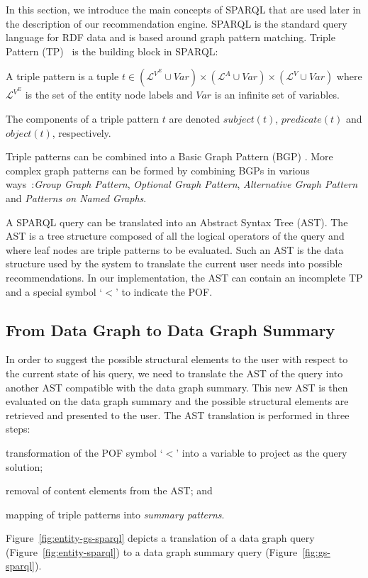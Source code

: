 In this section, we introduce the main concepts of SPARQL that are used later in the description of our recommendation engine. SPARQL is the standard query language for RDF data and is based around graph pattern matching. Triple Pattern (TP)~\cite{PrudS08} is the building block in SPARQL:

\begin{definition} A triple pattern is a tuple $t \in (\mathcal{L}^{V^E} \cup Var) \times (\mathcal{L}^A \cup Var) \times (\mathcal{L}^V \cup Var)$ where $\mathcal{L}^{V^E}$ is the set of the entity node labels and $Var$ is an infinite set of variables.
\label{def:triple-pattern}
\end{definition}
The components of a triple pattern $t$ are denoted $subject(t)$, $predicate(t)$ and $object(t)$, respectively.

Triple patterns can be combined into a Basic Graph Pattern (BGP) \cite{PrudS08}. More complex graph patterns can be formed by combining BGPs in various ways~\cite{PrudS08}:\emph{Group Graph Pattern}, \emph{Optional Graph Pattern}, \emph{Alternative Graph Pattern} and \emph{Patterns on Named Graphs}.

A SPARQL query can be translated into an Abstract Syntax Tree (AST). The AST is a tree structure composed of all the logical operators of the query and where leaf nodes are triple patterns to be evaluated. Such an AST is the data structure used by the system to translate the current user needs into possible recommendations. In our implementation, the AST can contain an incomplete TP and a special symbol `$<$' to indicate the POF.

\subsection{From Data Graph to Data Graph Summary}

In order to suggest the possible structural elements to the user with respect to the current state of his query, we need to translate the AST of the query into another AST compatible with the data graph summary. This new AST is then evaluated on the data graph summary and the possible structural elements are retrieved and presented to the user. The AST translation is performed in three steps:
\begin{inparaenum}
\item transformation of the POF symbol `$<$' into a variable to project as the query solution;
\item removal of content elements from the AST; and
\item mapping of triple patterns into \emph{summary patterns}.
\end{inparaenum}
Figure~\ref{fig:entity-gs-sparql} depicts a translation of a data graph query (Figure~\ref{fig:entity-sparql}) to a data graph summary query (Figure~\ref{fig:gs-sparql}).

